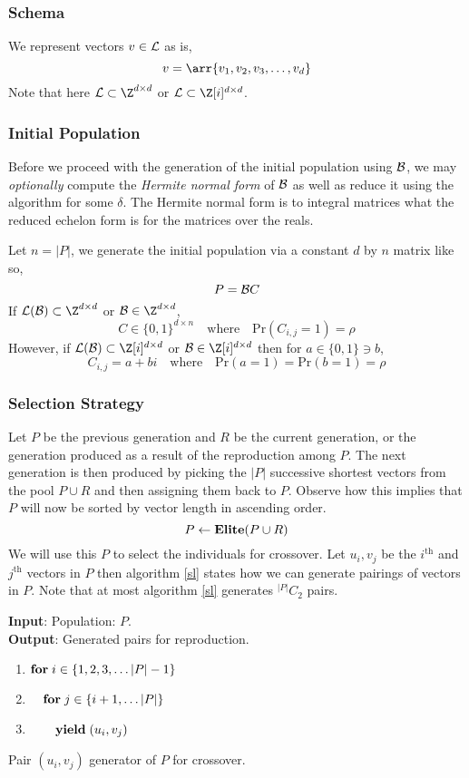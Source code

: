 \documentclass{homework}
\begin{document}
\subsubsection{Schema} We represent vectors $v \in \mathcal{L}$ as is,
\[
  v = \arr{v_1, v_2, v_3, \dots, v_d}
\]
Note that here $\L \subset \Z^{d\times d}$ or $\L \subset \G^{d\times d}$.

\subsubsection{Initial Population} Before we proceed with the
generation of the initial population using $\mathcal{B}$, we may
\textit{optionally} compute the \textit{Hermite normal form} of $\mathcal{B}$
as well as reduce it using the \LLL{} algorithm for some $\delta$. The
Hermite normal form is to integral matrices what the reduced echelon
form is for the matrices over the reals.

Let $n = |P|$, we generate the initial population via a constant $d$
by $n$ matrix like so,
\[
  P = \mathcal{B} C
\]
If $\L(\B) \subset \Z^{d\times d}$ or $\B \in \Z^{d\times d}$,
\[
  C \in \{0, 1\}^{d\times n}\quad\text{where}\quad
  \text{Pr}(C_{i,j} = 1) = \rho
\]
However, if $\L(\B) \subset \G^{d\times d}$ or $\B \in \G^{d\times d}$
then for $a \in \{0, 1\} \ni b$,
\[
  C_{i,j} = a + bi\quad\text{where}\quad
  \text{Pr}(a = 1) = \text{Pr}(b = 1) = \rho
\]


\subsubsection{Selection Strategy} Let $P$ be the previous generation
and $R$ be the current generation, or the generation produced as a
result of the reproduction among $P$. The next generation is then
produced by picking the $|P|$ successive shortest vectors from the
pool $P \cup R$ and then assigning them back to $P$. Observe how this
implies that $P$ will now be sorted by vector length in ascending
order.
\[
  P \leftarrow \mathbf{Elite}(P \cup R)
\]
We will use this $P$ to select the individuals for crossover. Let
$u_i, v_j$ be the $i^\text{th}$ and $j^\text{th}$ vectors in $P$ then
algorithm \ref{sl} states how we can generate pairings of vectors in
$P$. Note that at most algorithm \ref{sl} generates $^{|P|}C_2$ pairs.

\begin{algorithm}
  \begin{flushleft}
    \noindent\textbf{Input}: Population: $P$. \\
    \noindent\textbf{Output}: Generated pairs for reproduction.
  \end{flushleft}
  \begin{enumerate}[label=\arabic*:]
    \item $\mathbf{for\;} i \in \{1, 2, 3, \dots |P| - 1\}$
    \item $\quad \mathbf{for\;} j \in \{i + 1, \dots |P|\}$
    \item $\quad\quad \mathbf{yield\;} (u_i, v_j)$
  \end{enumerate}
  \caption{Pair $(u_i, v_j)$ generator of $P$ for crossover.}
  \label{sl}
\end{algorithm}
\end{document}
